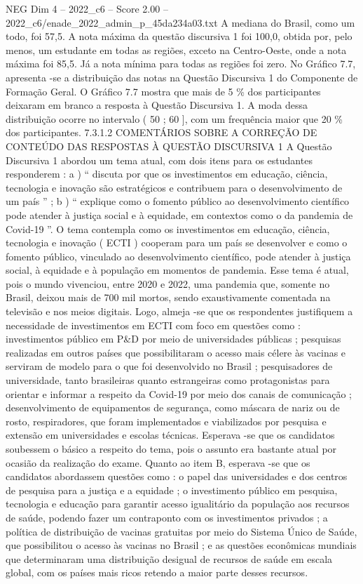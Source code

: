 \begin{textsample}{NEG Dim 4 – 2022\_c6 – Score 2.00 – 2022\_c6/enade\_2022\_admin\_p\_45da234a03.txt}
A mediana do Brasil, como um todo, foi 57,5.
A nota máxima da questão discursiva 1 foi 100,0, obtida por, pelo menos, um estudante em todas as regiões, exceto na Centro-Oeste, onde a nota máxima foi 85,5.
Já a nota mínima para todas as regiões foi zero.
No Gráfico 7.7, apresenta -se a distribuição das notas na Questão Discursiva 1 do Componente de Formação Geral.
O Gráfico 7.7 mostra que mais de 5 \% dos participantes deixaram em branco a resposta à Questão Discursiva 1.
A moda dessa distribuição ocorre no intervalo ( 50 ; 60 ], com um frequência maior que 20 \% dos participantes. 7.3.1.2 COMENTÁRIOS SOBRE A CORREÇÃO DE CONTEÚDO DAS RESPOSTAS À QUESTÃO DISCURSIVA 1 A Questão Discursiva 1 abordou um tema atual, com dois itens para os estudantes responderem : a ) “ discuta por que os investimentos em educação, ciência, tecnologia e inovação são estratégicos e contribuem para o desenvolvimento de um país ” ; b ) “ explique como o fomento público ao desenvolvimento científico pode atender à justiça social e à equidade, em contextos como o da pandemia de Covid-19 ”.
O tema contempla como os investimentos em educação, ciência, tecnologia e inovação ( ECTI ) cooperam para um país se desenvolver e como o fomento público, vinculado ao desenvolvimento científico, pode atender à justiça social, à equidade e à população em momentos de pandemia.
Esse tema é atual, pois o mundo vivenciou, entre 2020 e 2022, uma pandemia que, somente no Brasil, deixou mais de 700 mil mortos, sendo exaustivamente comentada na televisão e nos meios digitais.
Logo, almeja -se que os respondentes justifiquem a necessidade de investimentos em ECTI com foco em questões como : investimentos público em P\&D por meio de universidades públicas ; pesquisas realizadas em outros países que possibilitaram o acesso mais célere às vacinas e serviram de modelo para o que foi desenvolvido no Brasil ; pesquisadores de universidade, tanto brasileiras quanto estrangeiras como protagonistas para orientar e informar a respeito da Covid-19 por meio dos canais de comunicação ; desenvolvimento de equipamentos de segurança, como máscara de nariz ou de rosto, respiradores, que foram implementados e viabilizados por pesquisa e extensão em universidades e escolas técnicas.
Esperava -se que os candidatos soubessem o básico a respeito do tema, pois o assunto era bastante atual por ocasião da realização do exame.
Quanto ao item B, esperava -se que os candidatos abordassem questões como : o papel das universidades e dos centros de pesquisa para a justiça e a equidade ; o investimento público em pesquisa, tecnologia e educação para garantir acesso igualitário da população aos recursos de saúde, podendo fazer um contraponto com os investimentos privados ; a política de distribuição de vacinas gratuitas por meio do Sistema Único de Saúde, que possibilitou o acesso às vacinas no Brasil ; e as questões econômicas mundiais que determinaram uma distribuição desigual de recursos de saúde em escala global, com os países mais ricos retendo a maior parte desses recursos.

\end{textsample}
